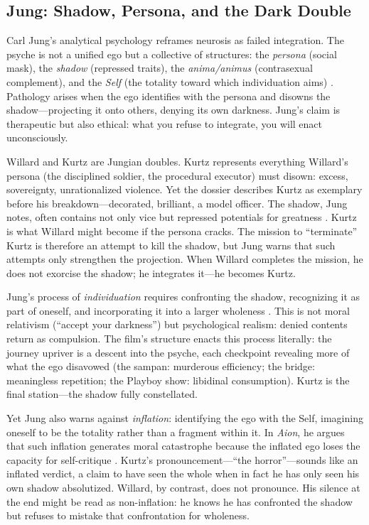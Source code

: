 \subsection*{Jung: Shadow, Persona, and the Dark Double}
\label{ssec:vi-jung}

Carl Jung's analytical psychology reframes neurosis as failed integration. The psyche is not a
unified ego but a collective of structures: the \emph{persona} (social mask), the
\emph{shadow} (repressed traits), the \emph{anima/animus} (contrasexual complement), and the
\emph{Self} (the totality toward which individuation aims) \parencite{JungArchetypes1969}.
Pathology arises when the ego identifies with the persona and disowns the shadow---projecting
it onto others, denying its own darkness. Jung's claim is therapeutic but also ethical: what
you refuse to integrate, you will enact unconsciously.

Willard and Kurtz are Jungian doubles. Kurtz represents everything Willard's persona (the
disciplined soldier, the procedural executor) must disown: excess, sovereignty,
unrationalized violence. Yet the dossier describes Kurtz as exemplary before his
breakdown---decorated, brilliant, a model officer. The shadow, Jung notes, often contains not
only vice but repressed potentials for greatness \parencite{JungArchetypes1969}. Kurtz is what
Willard might become if the persona cracks. The mission to ``terminate'' Kurtz is therefore an
attempt to kill the shadow, but Jung warns that such attempts only strengthen the projection.
When Willard completes the mission, he does not exorcise the shadow; he integrates it---he
becomes Kurtz.

Jung's process of \emph{individuation} requires confronting the shadow, recognizing it as part
of oneself, and incorporating it into a larger wholeness \parencite{JungArchetypes1969}. This
is not moral relativism (``accept your darkness'') but psychological realism: denied contents
return as compulsion. The film's structure enacts this process literally: the journey upriver
is a descent into the psyche, each checkpoint revealing more of what the ego disavowed (the
sampan: murderous efficiency; the bridge: meaningless repetition; the Playboy show: libidinal
consumption). Kurtz is the final station---the shadow fully constellated.

Yet Jung also warns against \emph{inflation}: identifying the ego with the Self, imagining
oneself to be the totality rather than a fragment within it. In \textit{Aion}, he argues that
such inflation generates moral catastrophe because the inflated ego loses the capacity for
self-critique \parencite{JungAion1969}. Kurtz's pronouncement---``the horror''---sounds like
an inflated verdict, a claim to have seen the whole when in fact he has only seen his own
shadow absolutized. Willard, by contrast, does not pronounce. His silence at the end might be
read as non-inflation: he knows he has confronted the shadow but refuses to mistake that
confrontation for wholeness.


